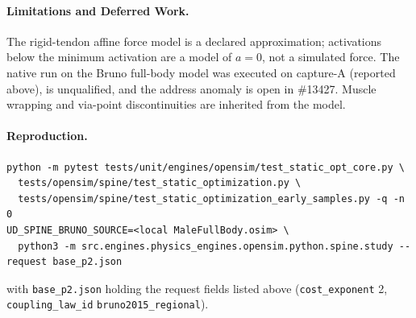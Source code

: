 \paragraph{Limitations and Deferred Work.}
The rigid-tendon affine force model is a declared approximation; activations
below the minimum activation are a model of $a=0$, not a simulated force. The
native run on the Bruno full-body model was executed on capture-A (reported
above), is unqualified, and the address anomaly is open in \#13427. Muscle
wrapping and via-point discontinuities are inherited from the model.

\paragraph{Reproduction.}
\begin{verbatim}
python -m pytest tests/unit/engines/opensim/test_static_opt_core.py \
  tests/opensim/spine/test_static_optimization.py \
  tests/opensim/spine/test_static_optimization_early_samples.py -q -n 0
UD_SPINE_BRUNO_SOURCE=<local MaleFullBody.osim> \
  python3 -m src.engines.physics_engines.opensim.python.spine.study --request base_p2.json
\end{verbatim}
with \texttt{base\_p2.json} holding the request fields listed above
(\texttt{cost\_exponent} 2, \texttt{coupling\_law\_id}
\texttt{bruno2015\_regional}).
